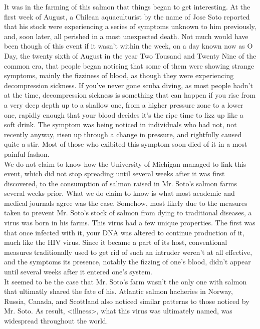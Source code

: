 \documentclass[12pt,openany]{memoir}
\begin{document}
It was in the farming of this salmon that things began to get interesting.
At the first week of August, a Chilean aquaculturist by the name of Jose Soto reported that his stock were experiencing a series of symptoms unknown to him previously, and, soon later, all perished in a most unexpected death.
Not much would have been though of this event if it wasn't within the week, on a day known now as O Day, the twenty sixth of August in the year Two Tousand and Twenty Nine of the common era, that people began noticing that some of them were showing strange symptoms, mainly the fizziness of blood, as though they were experiencing decompression sickness.
If you've never gone scuba diving, as most people hadn't at the time, decompression sickness is something that can happen if you rise from a very deep depth up to a shallow one, from a higher pressure zone to a lower one, rapidly enough that your blood decides it's the ripe time to fizz up like a soft drink.
The symptom was being noticed in individuals who had not, not recently anyway, risen up through a change in pressure, and rightfully caused quite a stir.
Most of those who exibited this symptom soon died of it in a most painful fashon.
\\

We do not claim to know how the University of Michigan managed to link this event, which did not stop spreading until several weeks after it was first discovered, to the consumption of salmon raised in Mr. Soto's salmon farms several weeks prior.
What we do claim to know is what most academic and medical journals agree was the case.
Somehow, most likely due to the measures taken to prevent Mr. Soto's stock of salmon from dying to traditional diseases, a virus was born in his farms.
This virus had a few unique properties.
The first was that once infected with it, your DNA was altered to continue production of it, much like the HIV virus.
Since it became a part of its host, conventional measures traditionally used to get rid of such an intruder weren't at all effective, and the symptoms its presence, notably the fizzing of one's blood, didn't appear until several weeks after it entered one's system.
\\

It seemed to be the case that Mr. Soto's farm wasn't the only one with salmon that ultimatly shared the fate of his.
Atlantic salmon hacheries in Norway, Russia, Canada, and Scottland also noticed similar patterns to those noticed by Mr. Soto.
As result, <illness>, what this virus was ultimately named, was widespread throughout the world.
\\
\end{document}
